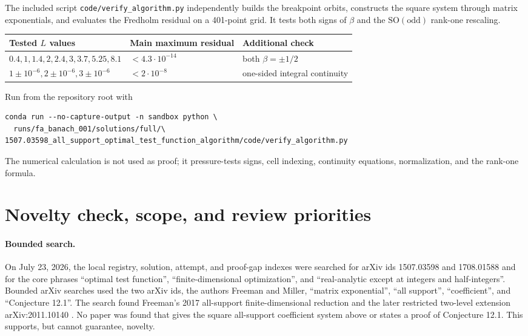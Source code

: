 \documentclass[11pt]{article}
\theoremstyle{definition}
\theoremstyle{remark}
\newcommand{\1}{\mathbf 1}
\newcommand{\SOo}{\mathrm{SO(odd)}}
\begin{document}
The included script \texttt{code/verify\_algorithm.py} independently builds
the breakpoint orbits, constructs the square system through matrix
exponentials, and evaluates the Fredholm residual on a 401-point grid.
It tests both signs of $\beta$ and the $\SOo$ rank-one rescaling.

\begin{center}
\begin{tabular}{@{}lll@{}}
\toprule
Tested $L$ values & Main maximum residual & Additional check\\
\midrule
$0.4,1,1.4,2,2.4,3,3.7,5.25,8.1$
& $<4.3\cdot10^{-14}$ & both $\beta=\pm1/2$\\
$1\pm10^{-6},2\pm10^{-6},3\pm10^{-6}$
& $<2\cdot10^{-8}$ & one-sided integral continuity\\
\bottomrule
\end{tabular}
\end{center}

Run from the repository root with
\begin{verbatim}
conda run --no-capture-output -n sandbox python \
  runs/fa_banach_001/solutions/full/\
1507.03598_all_support_optimal_test_function_algorithm/code/verify_algorithm.py
\end{verbatim}
The numerical calculation is not used as proof; it pressure-tests signs,
cell indexing, continuity equations, normalization, and the rank-one
formula.

\section{Novelty check, scope, and review priorities}

\paragraph{Bounded search.}
On July 23, 2026, the local registry, solution, attempt, and proof-gap
indexes were searched for arXiv ids 1507.03598 and 1708.01588 and for the
core phrases ``optimal test function'', ``finite-dimensional
optimization'', and ``real-analytic except at integers and half-integers''.
Bounded arXiv searches used the two arXiv ids, the authors Freeman and
Miller, ``matrix exponential'', ``all support'', ``coefficient'', and
``Conjecture 12.1''. The search found Freeman's 2017 all-support
finite-dimensional reduction \cite{Freeman2017} and the later restricted
two-level extension arXiv:2011.10140 \cite{BCDMZ2020}. No paper was found
that gives the square all-support coefficient system above or states a
proof of Conjecture 12.1. This supports, but cannot guarantee, novelty.
\end{document}
